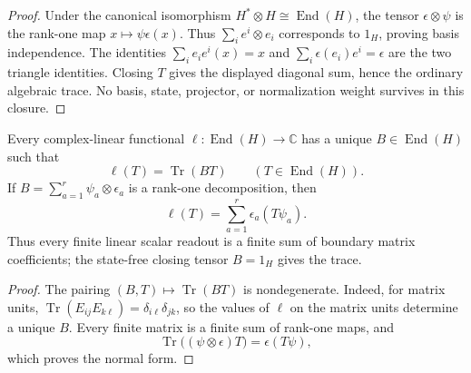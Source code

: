 \documentclass[12pt,a4paper]{article}
\begin{document}
\begin{proof}
Under the canonical isomorphism
\(H^*\otimes H\cong\operatorname{End}(H)\), the tensor
\(\epsilon\otimes\psi\) is the rank-one map
\(x\mapsto\psi\epsilon(x)\).  Thus
\(\sum_i e^i\otimes e_i\) corresponds to \(1_H\), proving basis
independence.  The identities
\(\sum_i e_i e^i(x)=x\) and
\(\sum_i\epsilon(e_i)e^i=\epsilon\) are the two triangle identities.
Closing \(T\) gives the displayed diagonal sum, hence the ordinary algebraic
trace.  No basis, state, projector, or normalization weight survives in this
closure.
\end{proof}

\begin{lemma}
\label{p2:lem:linear-readout-exhaustion}
Every complex-linear functional
\(\ell:\operatorname{End}(H)\to\mathbb C\) has a unique
\(B\in\operatorname{End}(H)\) such that
\[
 \ell(T)=\operatorname{Tr}(BT)\qquad(T\in\operatorname{End}(H)).
\]
If \(B=\sum_{a=1}^r\psi_a\otimes\epsilon_a\) is a rank-one
decomposition, then
\[
 \ell(T)=\sum_{a=1}^r\epsilon_a(T\psi_a).
\]
Thus every finite linear scalar readout is a finite sum of boundary matrix
coefficients; the state-free closing tensor \(B=1_H\) gives the trace.
\end{lemma}

\begin{proof}
The pairing \((B,T)\mapsto\operatorname{Tr}(BT)\) is nondegenerate.  Indeed,
for matrix units,
\(\operatorname{Tr}(E_{ij}E_{k\ell})=\delta_{i\ell}\delta_{jk}\),
so the values of \(\ell\) on the matrix units determine a unique \(B\).
Every finite matrix is a finite sum of rank-one maps, and
\[
 \operatorname{Tr}\bigl((\psi\otimes\epsilon)T\bigr)
 =\epsilon(T\psi),
\]
which proves the normal form.
\end{proof}
\end{document}
